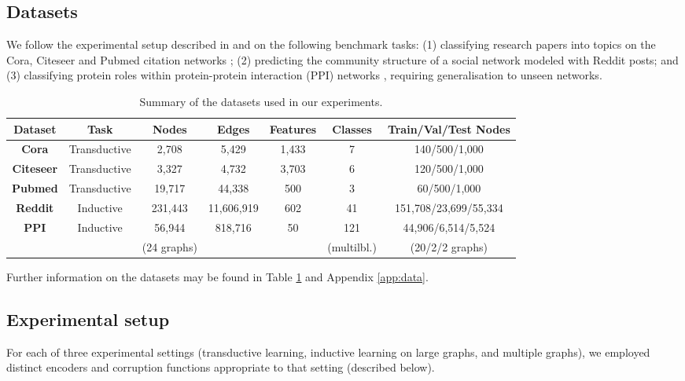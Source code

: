 \documentclass{article} \usepackage{iclr2019_conference,times}
\begin{document}
\subsection{Datasets}

We follow the experimental setup described in \citet{kipf2016semi} and \citet{hamilton2017inductive} on the following benchmark tasks: (1) classifying research papers into topics on the Cora, Citeseer and Pubmed citation networks \citep{sen2008collective}; (2) predicting the community structure of a social network modeled with Reddit posts; and (3) classifying protein roles within protein-protein interaction (PPI) networks \citep{zitnik2017predicting}, requiring generalisation to unseen networks. 

\begin{table}
\small
\caption{Summary of the datasets used in our experiments.}
\label{datasets}
\begin{center}
\begin{tabular}{c c c c c c c}
\toprule 
{\bf Dataset} & {\bf Task} & {\bf Nodes} & {\bf Edges} & {\bf Features} &  {\bf Classes} & {\bf Train/Val/Test Nodes} \\ \midrule
{\bf Cora} & Transductive & 2,708 & 5,429 & 1,433 & 7 & 140/500/1,000\\
{\bf Citeseer} & Transductive & 3,327 & 4,732 & 3,703 & 6 & 120/500/1,000 \\
{\bf Pubmed} & Transductive & 19,717 & 44,338 & 500 & 3 & 60/500/1,000\\
{\bf Reddit} & Inductive & 231,443 & 11,606,919 & 602 & 41 & 151,708/23,699/55,334\\
\multirow{2}{*}{\bf PPI} & \multirow{2}{*}{Inductive} & 56,944 & \multirow{2}{*}{818,716} & \multirow{2}{*}{50} & 121 & 44,906/6,514/5,524 \\
& & (24 graphs) & & & (multilbl.) & (20/2/2 graphs)\\
\bottomrule
\end{tabular}
\end{center}
\end{table}

Further information on the datasets may be found in Table \ref{datasets} and Appendix \ref{app:data}.

\subsection{Experimental setup}\label{sec:expt}

For each of three experimental settings (transductive learning, inductive learning on large graphs, and multiple graphs), we employed distinct encoders and corruption functions appropriate to that setting (described below). 
\end{document}
